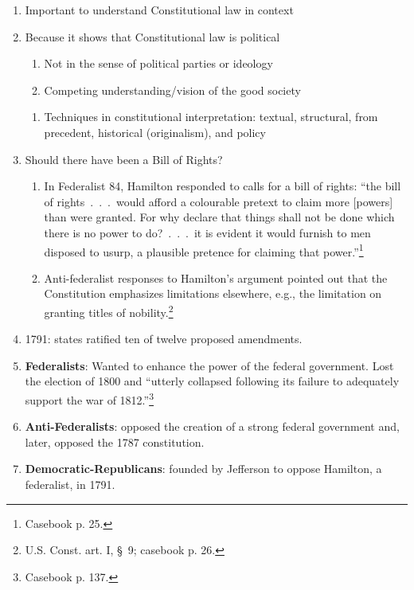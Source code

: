     \begin{enumerate} 
    \item Important to understand Constitutional law in context
    \item Because it shows that Constitutional law is political
\begin{enumerate} 
    \item Not in the sense of political parties or ideology
    \item Competing understanding/vision of the good society
    \end{enumerate}
    \begin{enumerate}
    \item Techniques in constitutional interpretation: textual, structural, from precedent, historical (originalism), and policy
    \end{enumerate}
    \item Should there have been a Bill of Rights?
    \begin{enumerate}
        \item In Federalist 84, Hamilton responded to calls for a bill of 
        rights: ``the bill of rights~.~.~.~would afford a colourable pretext 
        to claim more [powers] than were granted. For why declare that things 
        shall not be done which there is no power to do?~.~.~.~it is evident 
        it would furnish to men disposed to usurp, a plausible pretence for 
        claiming that power.''\footnote{Casebook p. 25.}
        \item Anti-federalist responses to Hamilton's argument pointed out 
        that the Constitution emphasizes limitations elsewhere, e.g., the 
        limitation on granting titles of nobility.\footnote{U.S. Const. art. 
        I, \S\ 9; casebook p. 26.}
    \end{enumerate}
    \item 1791: states ratified ten of twelve proposed amendments.
    \item \textbf{Federalists}: Wanted to enhance the power of the federal 
    government.  Lost the election of 1800 and ``utterly collapsed following 
    its failure to adequately support the war of 1812.''\footnote{Casebook p. 
    137.}
    \item \textbf{Anti-Federalists}: opposed the creation of a strong federal 
    government and, later, opposed the 1787 constitution.
    \item \textbf{Democratic-Republicans}: founded by Jefferson to oppose 
    Hamilton, a federalist, in 1791.

\end{enumerate}
